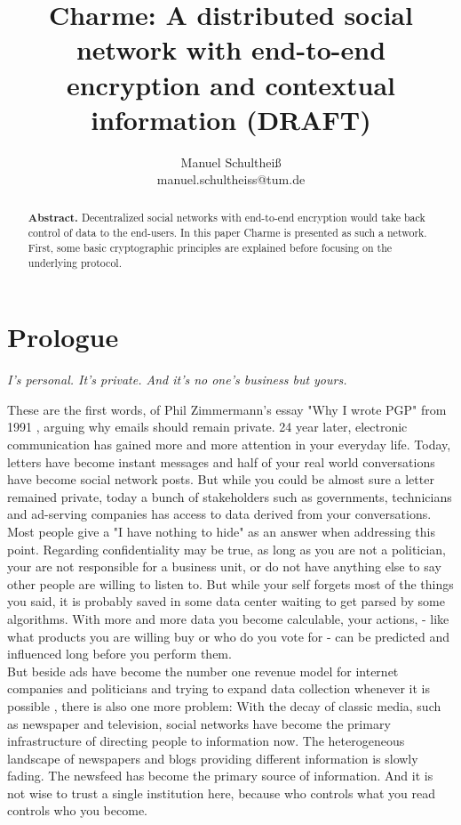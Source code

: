 \documentclass{scrartcl}
\title{Charme: A distributed social network with end-to-end encryption and contextual information (DRAFT)}
\author{Manuel Schultheiß\\manuel.schultheiss@tum.de}
\begin{document}
  \sloppy %
 
\maketitle

\begin{abstract}
\noindent
  \textbf{Abstract.} 
  Decentralized social networks with end-to-end encryption would take back control of data to the end-users. In this paper Charme is presented as such a network. First, some  basic cryptographic  principles are explained before focusing on the underlying  protocol.
  \end{abstract}
  
  
\tableofcontents
 \newpage
\section{Prologue}

\begin{center}
\textit{I's personal. It's private.
And it's no one's business but yours.}
\end{center}

These are the first words, of Phil Zimmermann's essay "Why I wrote PGP" from 1991 \cite{PHIL}, arguing why emails should remain private. 24 year later, electronic communication has gained more and more attention in your everyday life. Today, letters have become instant messages and half of your real world conversations have become social network posts. But while you could be almost sure a letter remained private, today a bunch of stakeholders such as governments, technicians and ad-serving companies has access to data derived from your conversations. \\


Most people give a "I have nothing to hide" as an answer when addressing this point. Regarding confidentiality may be true, as long as you are not a politician, your are not responsible for a business unit, or do not have anything else to say other people are willing to listen to. But while your self forgets most of the things you said, it is probably saved in some data center waiting to get parsed by some algorithms. With more and more data you become calculable, your actions, - like what products you are willing buy or who do you vote for - can be predicted and influenced long before you perform them.\\


But beside ads have become the number one revenue model for internet companies and politicians and trying to expand data collection  whenever it is possible \cite{EFF}, there is also one more problem: With the decay of classic media, such as newspaper and television, social networks have become the primary infrastructure of directing people to information now. The heterogeneous  landscape of newspapers and blogs providing different information is slowly fading. The newsfeed has become the primary source of information. And it is not  wise to trust a single institution  here, because who controls what you read controls who you become.
\end{document}

